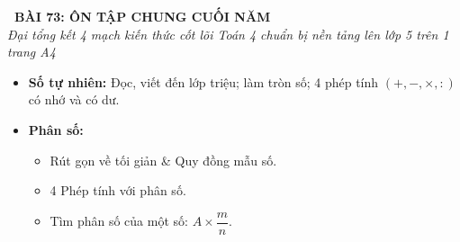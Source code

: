 \documentclass[14pt,a4paper,oneside]{extbook}
\begin{document}
\noindent
\begin{tcolorbox}[
  enhanced,
  colback=teal!8!white,
  colframe=teal!80!black,
  arc=3mm, boxrule=1pt,
  left=3mm, right=3mm, top=2mm, bottom=2mm,
  halign=center
]
  {\Large\bfseries\color{teal!90!black}\faBookmark\ BÀI 73: ÔN TẬP CHUNG CUỐI NĂM}\\[1.5pt]
  {\footnotesize\itshape\color{black!75} Đại tổng kết 4 mạch kiến thức cốt lõi Toán 4 chuẩn bị nền tảng lên lớp 5 trên 1 trang A4}
\end{tcolorbox}

\vspace{-2.5mm}

\noindent
\begin{minipage}[t]{0.49\textwidth}\vspace{0pt}
\begin{tcolorbox}[
  enhanced,
  colback=blue!4!white,
  colframe=blue!75!black,
  arc=2mm, boxrule=0.8pt,
  left=2mm, right=2mm, top=1.8mm, bottom=1.8mm,
  title={\footnotesize\bfseries\color{white}\faCalculator\ 1. Mạch Số học \& Tính toán}
]
{\footnotesize
\begin{itemize}\setlength{\itemsep}{1pt}\setlength{\leftskip}{-2.5mm}
  \item \textbf{Số tự nhiên:} Đọc, viết đến lớp triệu; làm tròn số; 4 phép tính $(+, -, \times, :)$ có nhớ và có dư.
  \item \textbf{Phân số:}
  \begin{itemize}\setlength{\itemsep}{0.5pt}\setlength{\leftskip}{-2.5mm}
    \item Rút gọn về tối giản \& Quy đồng mẫu số.
    \item 4 Phép tính với phân số.
    \item Tìm phân số của một số: $A \times \dfrac{m}{n}$.
  \end{itemize}
\end{itemize}
}
\end{tcolorbox}
\end{minipage}
\hfill
\end{document}
